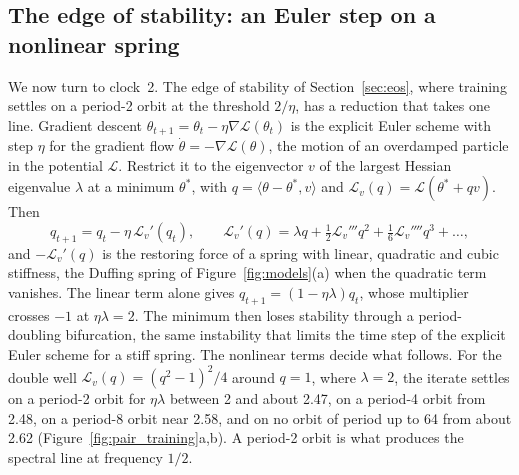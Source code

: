 \subsection{The edge of stability: an Euler step on a nonlinear spring}
\label{sec:spring}

We now turn to clock~2. The edge of stability of Section~\ref{sec:eos}, where training settles on a period-2 orbit at the threshold $2/\eta$, has a reduction that takes one line. Gradient descent $\theta_{t+1}=\theta_t-\eta\nabla\mathcal L(\theta_t)$ is the explicit Euler scheme with step $\eta$ for the gradient flow $\dot\theta=-\nabla\mathcal L(\theta)$, the motion of an overdamped particle in the potential $\mathcal L$. Restrict it to the eigenvector $v$ of the largest Hessian eigenvalue $\lambda$ at a minimum $\theta^\ast$, with $q=\langle\theta-\theta^\ast,v\rangle$ and $\mathcal L_v(q)=\mathcal L(\theta^\ast+qv)$. Then
\begin{equation}
q_{t+1}=q_t-\eta\,\mathcal L_v'(q_t),\qquad \mathcal L_v'(q)=\lambda q+\tfrac12\mathcal L_v'''q^2+\tfrac16\mathcal L_v''''q^3+\dots,
\label{eq:gd_spring}
\end{equation}
and $-\mathcal L_v'(q)$ is the restoring force of a spring with linear, quadratic and cubic stiffness, the Duffing spring of Figure~\ref{fig:models}(a) when the quadratic term vanishes. The linear term alone gives $q_{t+1}=(1-\eta\lambda)q_t$, whose multiplier crosses $-1$ at $\eta\lambda=2$. The minimum then loses stability through a period-doubling bifurcation, the same instability that limits the time step of the explicit Euler scheme for a stiff spring. The nonlinear terms decide what follows. For the double well $\mathcal L_v(q)=(q^2-1)^2/4$ around $q=1$, where $\lambda=2$, the iterate settles on a period-2 orbit for $\eta\lambda$ between 2 and about 2.47, on a period-4 orbit from 2.48, on a period-8 orbit near 2.58, and on no orbit of period up to 64 from about 2.62 (Figure~\ref{fig:pair_training}a,b). A period-2 orbit is what produces the spectral line at frequency $1/2$.


